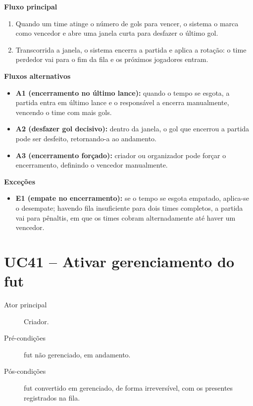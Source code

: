 \begin{apendicesenv}
        \noindent\textbf{Fluxo principal}
        \begin{enumerate}
            \item Quando um time atinge o número de gols para vencer, o sistema o marca como vencedor e abre uma janela curta para desfazer o último gol.
            \item Transcorrida a janela, o sistema encerra a partida e aplica a rotação: o time perdedor vai para o fim da fila e os próximos jogadores entram.
        \end{enumerate}

        \noindent\textbf{Fluxos alternativos}
        \begin{itemize}
            \item \textbf{A1 (encerramento no último lance):} quando o tempo se esgota, a partida entra em último lance e o responsável a encerra manualmente, vencendo o time com mais gols.
            \item \textbf{A2 (desfazer gol decisivo):} dentro da janela, o gol que encerrou a partida pode ser desfeito, retornando-a ao andamento.
            \item \textbf{A3 (encerramento forçado):} criador ou organizador pode forçar o encerramento, definindo o vencedor manualmente.
        \end{itemize}

        \noindent\textbf{Exceções}
        \begin{itemize}
            \item \textbf{E1 (empate no encerramento):} se o tempo se esgota empatado, aplica-se o desempate; havendo fila insuficiente para dois times completos, a partida vai para pênaltis, em que os times cobram alternadamente até haver um vencedor.
        \end{itemize}

    \section*{UC41 -- Ativar gerenciamento do fut}
        \begin{description}
            \item[Ator principal] Criador.
            \item[Pré-condições] fut não gerenciado, em andamento.
            \item[Pós-condições] fut convertido em gerenciado, de forma irreversível, com os presentes registrados na fila.
        \end{description}


\end{apendicesenv}
